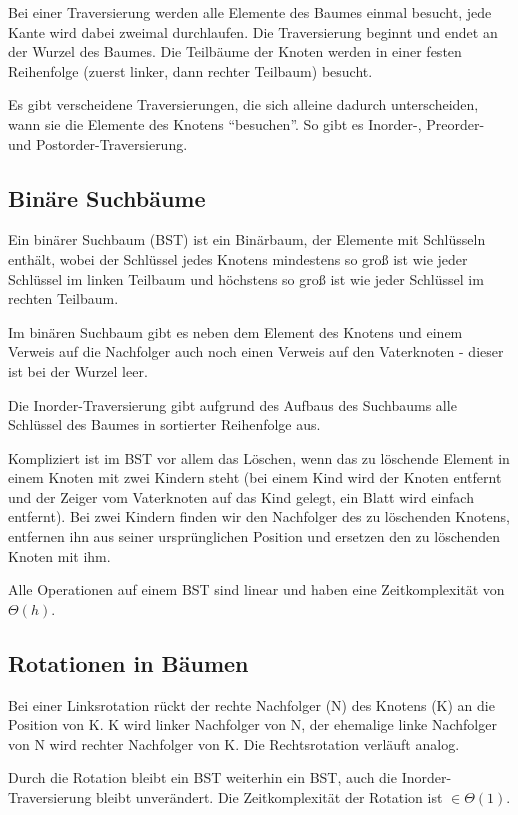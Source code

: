 \documentclass[12pt]{article}
\begin{document}
Bei einer Traversierung werden alle Elemente des Baumes einmal besucht, jede Kante wird dabei zweimal durchlaufen. Die Traversierung beginnt und endet an der Wurzel des Baumes. Die Teilbäume der Knoten werden in einer festen Reihenfolge (zuerst linker, dann rechter Teilbaum) besucht.

Es gibt verscheidene Traversierungen, die sich alleine dadurch unterscheiden, wann sie die Elemente des Knotens \enquote{besuchen}. So gibt es Inorder-, Preorder- und Postorder-Traversierung.

\subsection{Binäre Suchbäume}

Ein binärer Suchbaum (BST) ist ein Binärbaum, der Elemente mit Schlüsseln enthält, wobei der Schlüssel jedes Knotens mindestens so groß ist wie jeder Schlüssel im linken Teilbaum und höchstens so groß ist wie jeder Schlüssel im rechten Teilbaum.

Im binären Suchbaum gibt es neben dem Element des Knotens und einem Verweis auf die Nachfolger auch noch einen Verweis auf den Vaterknoten - dieser ist bei der Wurzel leer.

Die Inorder-Traversierung gibt aufgrund des Aufbaus des Suchbaums alle Schlüssel des Baumes in sortierter Reihenfolge aus.

Kompliziert ist im BST vor allem das Löschen, wenn das zu löschende Element in einem Knoten mit zwei Kindern steht (bei einem Kind wird der Knoten entfernt und der Zeiger vom Vaterknoten auf das Kind gelegt, ein Blatt wird einfach entfernt). Bei zwei Kindern finden wir den Nachfolger des zu löschenden Knotens, entfernen ihn aus seiner ursprünglichen Position und ersetzen den zu löschenden Knoten mit ihm.

Alle Operationen auf einem BST sind linear und haben eine Zeitkomplexität von $\Theta(h)$.

\subsection{Rotationen in Bäumen}

Bei einer Linksrotation rückt der rechte Nachfolger (N) des Knotens (K) an die Position von K. K wird linker Nachfolger von N, der ehemalige linke Nachfolger von N wird rechter Nachfolger von K. Die Rechtsrotation verläuft analog.

Durch die Rotation bleibt ein BST weiterhin ein BST, auch die Inorder-Traversierung bleibt unverändert. Die Zeitkomplexität der Rotation ist $\in \Theta(1)$.
\end{document}
